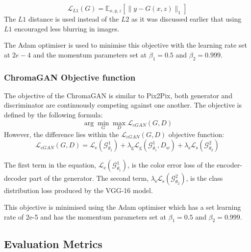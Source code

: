 $$
\mathcal{L}_{L 1}(G)=\mathbb{E}_{x, y, z}\left[\|y-G(x, z)\|_{1}\right]
$$
The \(L1\) distance is used instead of the \(L2\) as it was discussed earlier that using \(L1\) encouraged less blurring in images.

The Adam optimiser is used to minimise this objective with the learning rate set at \(2e-4\) and the momentum parameters set at \(\beta_1 = 0.5\) and \(\beta_2 = 0.999\).



\subsubsection*{ChromaGAN Objective function}
The objective of the ChromaGAN is similar to Pix2Pix, both generator and discriminator are continuously competing against one another. The objective is defined by the following formula:
\begin{equation}
\arg \min _{G} \max _{D} \mathcal{L}_{c G A N}(G, D)
\end{equation}
However, the difference lies within the \(\mathcal{L}_{c G A N}(G, D)\) objective function:
\begin{equation}
\mathcal{L}_{c G A N}(G, D)=\mathcal{L}_{\mathrm{e}}\left(\mathcal{G}_{\theta_{1}}^{1}\right)+\lambda_{\mathrm{g}} \mathcal{L}_{\mathrm{g}}\left(\mathcal{G}_{\theta_{1}}^{1}, D_{w}\right)+\lambda_{\mathrm{s}} \mathcal{L}_{\mathrm{s}}\left(\mathcal{G}_{\theta_{2}}^{2}\right)
\end{equation}

The first term in the equation, $\mathcal{L}_{\mathrm{e}}\left(\mathcal{G}_{\theta_{1}}^{1}\right)$, is the color error loss of the encoder-decoder part of the generator. The second term, $\lambda_{\mathrm{s}} \mathcal{L}_{\mathrm{s}}\left(\mathcal{G}_{\theta_{2}}^{2}\right)$, is the class distribution loss produced by the VGG-16 model.

This objective is minimised using the Adam optimiser which has a set learning rate of 2e-5 and has the momentum parameters set at \(\beta_1 = 0.5\) and \(\beta_2 = 0.999\).


\pagebreak
\subsection{Evaluation Metrics}

